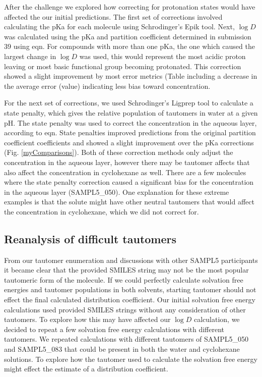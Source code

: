 After the challenge we explored how correcting for protonation states would have affected the our initial predictions. 
The first set of corrections involved calculating the pKa for each molecule using Schrodinger's Epik tool. 
Next, $\log D$ was calculated using the pKa and partition coefficient determined in submission 39 using eqn. %
For compounds with more than one pKa, the one which caused the largest change in $\log D$ was used, this would represent the most acidic proton leaving or most basic functional group becoming protonated. %
This correction showed a slight improvement by most error metrics (Table %
including a decrease in the average error (value) indicating less bias toward concentration. 

For the next set of corrections, we used Schrodinger's Ligprep tool to calculate a state penalty, which gives the relative population of tautomers in water at a given pH. %
The state penalty was used to correct the concentration in the aqueous layer, according to eqn. %
State penalties improved predictions from the original partition coefficient coefficients and showed a slight improvement over the pKa corrections (Fig. \ref{myComparisons}). 
Both of these correction methods only adjust the concentration in the aqueous layer, however there may be tautomer affects that also affect the concentration in cyclohexane as well. 
There are a few molecules where the state penalty correction caused a significant bias for the concentration in the aqueous layer (SAMPL5\_050). %
One explanation for these extreme examples is that the solute might have other neutral tautomers that would affect the concentration in cyclohexane, which we did not correct for. 


\subsection{Reanalysis of difficult tautomers} %
\label{results:7}
From our tautomer enumeration and discussions with other SAMPL5 participants %
it became clear that the provided SMILES string may not be the most popular %
tautomeric form of the molecule. 
If we could perfectly calculate solvation free energies and tautomer populations in both solvents, starting tautomer should not effect the final calculated distribution coefficient.  
Our initial solvation free energy calculations used provided SMILES strings without any consideration of other tautomers.
To explore how this may have affected our $\log D$ calculation, we decided to repeat a few solvation free energy calculations with different tautomers. 
We repeated calculations with different tautomers of SAMPL5\_050 and SAMPL5\_083 that could be present in both the water and cyclohexane solutions. 
To explore how the tautomer used to calculate the solvation free energy might effect the estimate of a distribution coefficient. 


